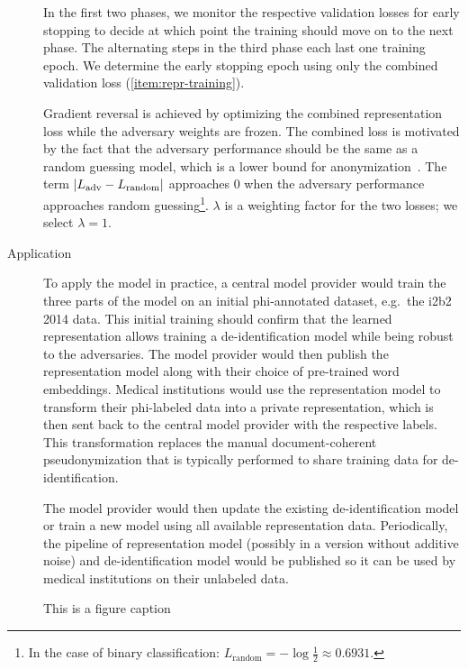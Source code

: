 \begin{description}
    In the first two phases, we monitor the respective validation losses for early stopping to decide at which point the training should move on to the next phase.
    The alternating steps in the third phase each last one training epoch.
    We determine the early stopping epoch using only the combined validation loss (\cref{item:repr-training}).
    
    Gradient reversal is achieved by optimizing the combined representation loss while the adversary weights are frozen.
    The combined loss is motivated by the fact that the adversary performance should be the same as a random guessing model, which is a lower bound for anonymization~\citep{feutry2018learning}.
    The term $\lvert L_{\text{adv}} - L_{\text{random}}\rvert$ approaches $0$ when the adversary performance approaches random guessing\footnote{In the case of binary classification: $L_{\text{random}} = -\log \frac{1}{2} \approx 0.6931$.}.
    $\lambda$ is a weighting factor for the two losses; we select $\lambda=1$.
    
    \item[Application]
    To apply the model in practice, a central model provider would train the three parts of the model on an initial \ac{phi}-annotated dataset, e.g.\ the i2b2 2014 data.
    This initial training should confirm that the learned representation allows training a de-identification model while being robust to the adversaries.
    The model provider would then publish the representation model along with their choice of pre-trained word embeddings.
    Medical institutions would use the representation model to transform their \ac{phi}-labeled data into a private representation, which is then sent back to the central model provider with the respective labels.
    This transformation replaces the manual document-coherent pseudonymization that is typically performed to share training data for de-identification.
    
    The model provider would then update the existing de-identification model or train a new model using all available representation data.
    Periodically, the pipeline of representation model (possibly in a version without additive noise) and de-identification model would be published so it can be used by medical institutions on their unlabeled data.
    
\end{description}

\begin{figure*}
    \centering
    
    \caption{This is a figure caption}
\end{figure*}

